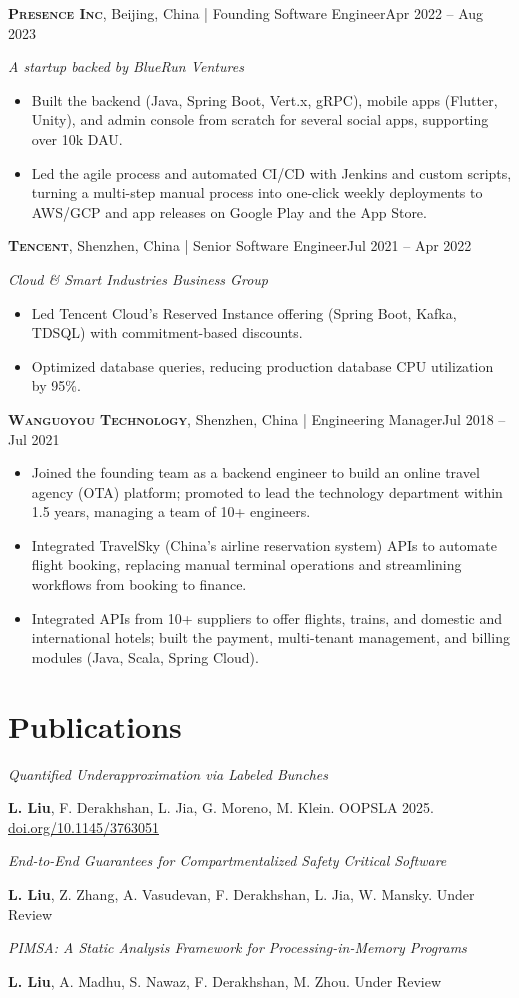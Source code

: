 \documentclass[11pt,letterpaper]{article}
\newcommand{\job}[4]{%
  \textbf{\textsc{#1}}, #2 | #3\hfill #4\par}
\newcommand{\jobnote}[1]{\textit{#1}\par}
\newcommand{\pub}[2]{\textit{#1}\par #2\par}
\begin{document}
\job{Presence Inc}{Beijing, China}{Founding Software Engineer}{Apr 2022 -- Aug 2023}
\jobnote{A startup backed by BlueRun Ventures}
\begin{itemize}
  \item Built the backend (Java, Spring Boot, Vert.x, gRPC), mobile apps (Flutter, Unity), and admin console from scratch
        for several social apps, supporting over 10k DAU.
  \item Led the agile process and automated CI/CD with Jenkins and custom scripts, turning a multi-step manual process into
        one-click weekly deployments to AWS/GCP and app releases on Google Play and the App Store.
\end{itemize}

\job{Tencent}{Shenzhen, China}{Senior Software Engineer}{Jul 2021 -- Apr 2022}
\jobnote{Cloud \& Smart Industries Business Group}
\begin{itemize}
  \item Led Tencent Cloud's Reserved Instance offering (Spring Boot, Kafka, TDSQL) with commitment-based discounts.
  \item Optimized database queries, reducing production database CPU utilization by 95\%.
\end{itemize}

\job{Wanguoyou Technology}{Shenzhen, China}{Engineering Manager}{Jul 2018 -- Jul 2021}
\begin{itemize}
  \item Joined the founding team as a backend engineer to build an online travel agency (OTA) platform; promoted to lead
        the technology department within 1.5 years, managing a team of 10+ engineers.
  \item Integrated TravelSky (China's airline reservation system) APIs to automate flight booking, replacing manual
        terminal operations and streamlining workflows from booking to finance.
  \item Integrated APIs from 10+ suppliers to offer flights, trains, and domestic and international hotels; built the
        payment, multi-tenant management, and billing modules (Java, Scala, Spring Cloud).
\end{itemize}

\section{Publications}
\pub{Quantified Underapproximation via Labeled Bunches}
    {\textbf{L. Liu}, F. Derakhshan, L. Jia, G. Moreno, M. Klein. OOPSLA 2025.
     \href{https://doi.org/10.1145/3763051}{doi.org/10.1145/3763051}}
\pub{End-to-End Guarantees for Compartmentalized Safety Critical Software}
    {\textbf{L. Liu}, Z. Zhang, A. Vasudevan, F. Derakhshan, L. Jia, W. Mansky. Under Review}
\pub{PIMSA: A Static Analysis Framework for Processing-in-Memory Programs}
    {\textbf{L. Liu}, A. Madhu, S. Nawaz, F. Derakhshan, M. Zhou. Under Review}
\end{document}
